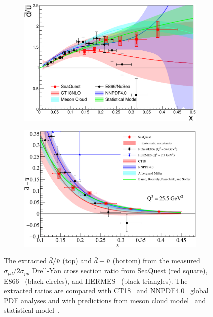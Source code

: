\documentclass[reprint,aps,unsortedaddress,superscriptaddress,prl,floatfix,showpacs,linenumbers,final]{revtex4-2}
\begin{document}
\begin{figure}[htpb!]
	\centering
	\begin{subfigure}{\linewidth}
		\includegraphics[width=\linewidth]{E906_E866_dbarubar_PDF_model.pdf}
	\end{subfigure}
	\begin{subfigure}{\linewidth}
		\includegraphics[width=\linewidth]{dbub_diff.pdf}
	\end{subfigure}
	\caption{The extracted $\bar{d}/\bar{u}$ (top) and $\bar{d}-\bar{u}$ (bottom)
		from the measured $\sigma_{pd}/2\sigma_{pp}$ Drell-Yan cross section ratio
		from SeaQuest (red square), E866~\cite{towell2001} (black circles), and HERMES~\cite{ackerstaff1998} (black triangles).
		The extracted ratios are compared with CT18~\cite{hou2021} and NNPDF4.0~\cite{ball2022a} global PDF analyses
		and with predictions from meson cloud model~\cite{alberg2022} and statistical model~\cite{soffer2019}.}
	\label{fig:e906_e866_dbarubar}
\end{figure}
\end{document}
